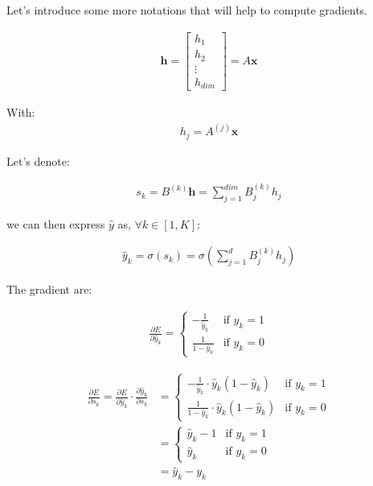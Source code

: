 Let's introduce some more notations that will help to compute gradients.

\begin{align}
	\mathbf{h}
	= \begin{bmatrix} 
		h_1 \\
		h_2 \\
		\vdots \\
		h_{\textit{dim}}
	\end{bmatrix}
	= A\mathbf{x}
\end{align}

With:
\begin{align}
	h_j = A^{(j)}\mathbf{x}
\end{align}


Let's denote:

\begin{align}
	s_k  = B^{(k)} \mathbf{h} = \sum_{j=1}^{\textit{dim}} B^{(k)}_j h_j 
\end{align}

we can then express $\hat y$ as, $\forall k \in [1, K]$:

\begin{align}
	\hat y_k  = \sigma(s_k) = \sigma( \sum_{j=1}^{d} B^{(k)}_j h_j) 
\end{align}


The gradient are:

\begin{align}
	\frac{ \partial E } { \partial \hat y_k } = 
		\left\{
		    \begin{array}{ll}
		        - \frac{1}{\hat y_k} & \mbox{if } y_k =1 \\
		        \frac{1}{1 - \hat y_k} & \mbox{if } y_k =0
		    \end{array}
		\right.
\end{align}


\begin{align}
	\frac{ \partial E } { \partial s_k } 
		=  
		\frac{ \partial E } { \partial \hat y_k } \cdot \frac{ \partial \hat y_k } { \partial s_k } 
		&=
		\left\{
		    \begin{array}{ll}
		        - \frac{1}{\hat y_k} \cdot \hat y_k (1 - \hat y_k)& \mbox{if } y_k =1 \\
		        \frac{1}{1 - \hat y_k} \cdot \hat y_k (1 - \hat y_k)& \mbox{if } y_k =0
		    \end{array}
		\right. \\
		&=
		\left\{
		    \begin{array}{ll}
		       \hat y_k - 1 & \mbox{if } y_k =1 \\
		       \hat y_k & \mbox{if } y_k =0
		    \end{array}
		\right. \\
		&= \hat y_k - y_k
\end{align}



